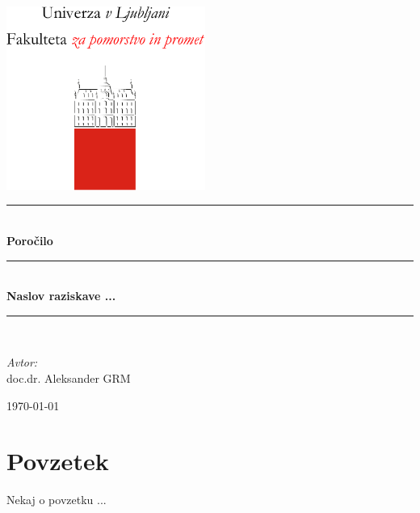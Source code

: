 \documentclass[11pt]{article}
\theoremstyle{definition}
\begin{document}

\thispagestyle{empty}

    \begin{center}
	    \includegraphics[height=6cm]{figs/fpp_logo_vertical_slo_red.pdf}\\[2.0 cm]
	    
		\rule{\linewidth}{1 mm} \\[7mm]
		{ \huge \bfseries Poročilo}\\[4mm]
		\rule{\linewidth}{1 mm} \\[4mm]
		{ \Large \bfseries Naslov raziskave ...}\\[1mm]
		\rule{\linewidth}{1 mm} \\[3cm]
		
		\begin{flushleft} \large
			\emph{Avtor:}\\[3mm]
			\hspace{1cm}doc.dr. Aleksander GRM\\[1mm]
		\end{flushleft}
		
		\vfill
		
		{\large \today}\\[1cm]
	\end{center}
	
\newpage
\thispagestyle{plain}

\tableofcontents

\newpage
\section*{Povzetek}

Nekaj o povzetku ...

\newpage
{}
\setcounter{page}{1}
\end{document}

